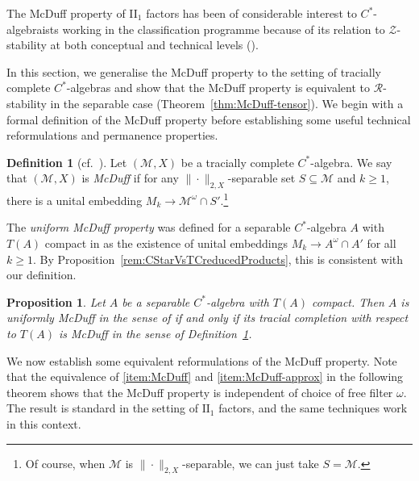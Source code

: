 \documentclass[a4paper,11pt]{amsart}
\newtheorem{proposition}[theorem]{Proposition}
\theoremstyle{definition}
\newtheorem{definition}[theorem]{Definition}
\numberwithin{equation}{section}
\numberwithin{theorem}{section}
\newcommand{\Z}{\mathcal Z}
\newcommand{\R}{\mathcal R}
\newcommand{\M}{\mathcal{M}}
\begin{document}
The McDuff property of II$_1$ factors has been of considerable interest to $C^*$-algebraists working in the classification programme because of its relation to $\Z$-stability at both conceptual and technical levels (\cite{TW07,MS12,KR14,TWW15,Sa12,CETW,CGSTW}).

In this section, we generalise the McDuff property to the setting of tracially complete $C^*$-algebras and show that the McDuff property is equivalent to $\R$-stability in the separable case (Theorem~\ref{thm:McDuff-tensor}). We begin with a formal definition of the McDuff property before establishing some useful technical reformulations and permanence properties.

\begin{definition}[{cf.\ \cite[Definition~4.2]{CETW}}]\label{def:UTCmcDuff}
Let $(\M,X)$ be a tracially complete $C^*$-algebra.  We say that $(\M,X)$ is \emph{McDuff} if for any $\|\cdot\|_{2, X}$-separable set $S \subseteq \M$ and $k \geq 1$, there is a unital embedding $M_k \rightarrow \M^\omega \cap S'$.\footnote{Of course, when $\M$ is $\|\cdot\|_{2, X}$-separable, we can just take $S=\M$.}
\end{definition}

The \emph{uniform McDuff property} was defined for a separable $C^*$-algebra $A$ with $T(A)$ compact in \cite[Definition 4.2]{CETW} as the existence of unital embeddings $M_k \rightarrow A^\omega \cap A'$ for all $k \geq 1$. By Proposition~\ref{rem:CStarVsTCreducedProducts}, this is consistent with our definition.

\begin{proposition}
    Let $A$ be a separable $C^*$-algebra with $T(A)$ compact.
    Then $A$ is uniformly McDuff in the sense of \cite{CETW} if and only if its tracial completion with respect to $T(A)$ is McDuff in the sense of Definition~\ref{def:UTCmcDuff}.
\end{proposition}

We now establish some equivalent reformulations of the McDuff property. Note that the equivalence of \ref{item:McDuff} and \ref{item:McDuff-approx} in the following theorem shows that the McDuff property is independent of choice of free filter $\omega$. The result is standard in the setting of $\mathrm{II}_1$ factors, and the same techniques work in this context.
\end{document}
